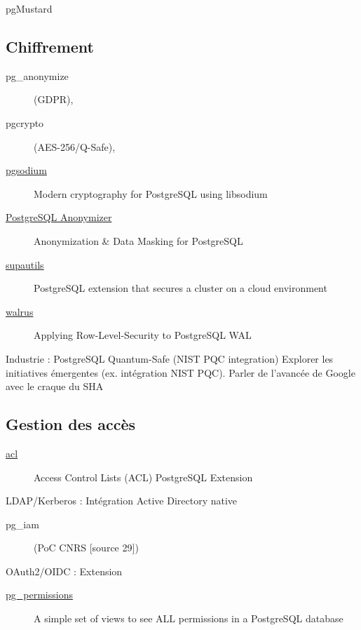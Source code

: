 \documentclass[a4paper,12pt]{article}
\begin{document}
\begin{multicols*}{2}
\begin{description}
\item[{pgMustard}] 
\end{description}
\subsection*{Chiffrement}
\label{sec:org5d1b9b0}
\begin{description}
\item[{pg\_anonymize}] (GDPR),
\item[{pgcrypto}] (AES-256/Q-Safe),
\item[{\href{https://github.com/michelp/pgsodium}{pgsodium}}] Modern cryptography for PostgreSQL using libsodium
\item[{\href{https://gitlab.com/dalibo/postgresql\_anonymizer}{PostgreSQL Anonymizer}}] Anonymization \& Data Masking for PostgreSQL
\item[{\href{https://github.com/supabase/supautils}{supautils}}] PostgreSQL extension that secures a cluster on a cloud environment
\item[{\href{https://github.com/supabase/walrus}{walrus}}] Applying Row-Level-Security to PostgreSQL WAL
\end{description}

Industrie : PostgreSQL Quantum-Safe (NIST PQC integration)
Explorer les initiatives émergentes (ex. intégration NIST PQC).
Parler de l'avancée de Google avec le craque du SHA
\subsection*{Gestion des accès}
\label{sec:orgabe8ae9}
\begin{description}
\item[{\href{https://github.com/arkhipov/acl}{acl}}] Access Control Lists (ACL) PostgreSQL Extension
\end{description}
LDAP/Kerberos : Intégration Active Directory native
\begin{description}
\item[{pg\_iam}] (PoC CNRS [source 29])
\end{description}
OAuth2/OIDC : Extension
\begin{description}
\item[{\href{https://github.com/cybertec-postgresql/pg\_permissions}{pg\_permissions}}] A simple set of views to see ALL permissions in a PostgreSQL database
\end{description}

\end{multicols*}
\end{document}
